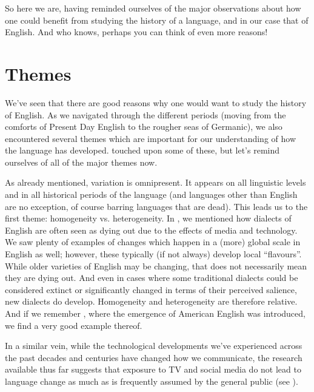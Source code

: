 \noindent So here we are, having reminded ourselves of the major observations about how one could benefit from studying the history of a language, and in our case that of English. And who knows, perhaps you can think of even more reasons!

\section{Themes}

We've seen that there are good reasons why one would want to study the history of English. As we navigated through the different periods (moving from the comforts of Present Day English to the rougher seas of Germanic), we also encountered several themes which are important for our understanding of how the language has developed.  touched upon some of these, but let's remind ourselves of all of the major themes now.

As already mentioned, variation is omnipresent. It appears on all linguistic levels and in all historical periods of the language (and languages other than English are no exception, of course barring languages that are dead). This leads us to the first theme: homogeneity vs. heterogeneity. In , we mentioned how dialects of English are often seen as dying out due to the effects of media and technology. We saw plenty of examples of changes which happen in a (more) global scale in English as well; however, these typically (if not always) develop local ``flavours''. While older varieties of English may be changing, that does not necessarily mean they are dying out. And even in cases where some traditional dialects could be considered extinct or significantly changed in terms of their perceived salience, new dialects do develop. Homogeneity and heterogeneity are therefore relative. And if we remember , where the emergence of American English was introduced, we find a very good example thereof.

In a similar vein, while the technological developments we've experienced across the past decades and centuries have changed how we communicate, the research available thus far suggests that exposure to TV and social media do not lead to language change as much as is frequently assumed by the general public (see ).

